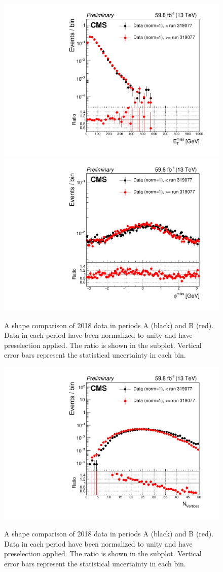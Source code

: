 \begin{figure}[H]
    \centering
    {\includegraphics[width=.49\textwidth]{Images/Analysis/Results_HEMFailureStudyPlots_Data_BeforeAfterRun319077/BasicLQ_uujj_Pt_miss_standard.pdf}}
    {\includegraphics[width=.49\textwidth]{Images/Analysis/Results_HEMFailureStudyPlots_Data_BeforeAfterRun319077/BasicLQ_uujj_Phi_miss_standard.pdf}}
    \caption{A shape comparison of 2018 data in periods A (black) and B (red). Data in each period have been normalized to unity and have preselection applied. The ratio \RatioDataAB is shown in the subplot. Vertical error bars represent the statistical uncertainty in each bin.}
    \label{figapp:hemMET}
\end{figure}

\begin{figure}[H]
    \centering
    {\includegraphics[width=.49\textwidth]{Images/Analysis/Results_HEMFailureStudyPlots_Data_BeforeAfterRun319077/BasicLQ_uujj_GoodVertexCount_linscale.pdf}}
    \caption{A shape comparison of 2018 data in periods A (black) and B (red). Data in each period have been normalized to unity and have preselection applied. The ratio \RatioDataAB is shown in the subplot. Vertical error bars represent the statistical uncertainty in each bin.}
    \label{figapp:hemvtx}
\end{figure}

